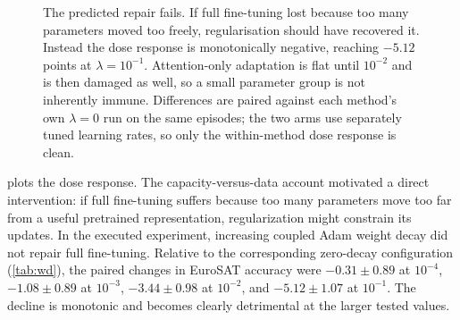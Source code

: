 \documentclass[11pt]{article}
\begin{document}
\begin{figure}[t]
\centering
{}
\caption{The predicted repair fails. If full fine-tuning lost because too many
parameters moved too freely, regularisation should have recovered it. Instead the
dose response is monotonically negative, reaching $-5.12$ points at
$\lambda=10^{-1}$. Attention-only adaptation is flat until $10^{-2}$ and is
then damaged as well, so a small parameter group is not inherently immune.
Differences are paired against each method's own $\lambda=0$ run on the same
episodes; the two arms use separately tuned learning rates, so only the
within-method dose response is clean.}
\label{fig:wd}
\end{figure}

\label{sec:wd}

 plots the dose response. The capacity-versus-data account motivated a direct intervention: if full fine-tuning suffers because too many parameters move too far from a useful pretrained representation, regularization might constrain its updates. In the executed experiment, increasing coupled Adam weight decay did not repair full fine-tuning. Relative to the corresponding zero-decay configuration (\cref{tab:wd}), the paired changes in EuroSAT accuracy were $-0.31\pm0.89$ at $10^{-4}$, $-1.08\pm0.89$ at $10^{-3}$, $-3.44\pm0.98$ at $10^{-2}$, and $-5.12\pm1.07$ at $10^{-1}$. The decline is monotonic and becomes clearly detrimental at the larger tested values.
\end{document}
